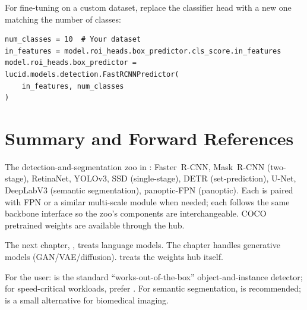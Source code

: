 For fine-tuning on a custom dataset, replace the classifier head
with a new one matching the number of classes:

\begin{lstlisting}[style=lucid,language=LucidPython]
num_classes = 10  # Your dataset
in_features = model.roi_heads.box_predictor.cls_score.in_features
model.roi_heads.box_predictor = lucid.models.detection.FastRCNNPredictor(
    in_features, num_classes
)
\end{lstlisting}

\section{Summary and Forward References}
\label{sec:detection_segmentation:summary}

The detection-and-segmentation zoo in \Lucid: Faster~R-CNN,
Mask~R-CNN (two-stage), RetinaNet, YOLOv3, SSD (single-stage),
DETR (set-prediction), U-Net, DeepLabV3 (semantic segmentation),
panoptic-FPN (panoptic). Each is paired with FPN or a similar
multi-scale module when needed; each follows the same backbone
interface so the zoo's components are interchangeable. COCO
pretrained weights are available through the hub.

The next chapter,
, treats language models. The
 chapter handles generative models
(GAN/VAE/diffusion).  treats the weights
hub itself.

\begin{lucidnote}
For the user:  is the
standard ``works-out-of-the-box'' object-and-instance detector;
for speed-critical workloads, prefer . For
semantic segmentation,  is
recommended;  is a small alternative for biomedical
imaging.
\end{lucidnote}
